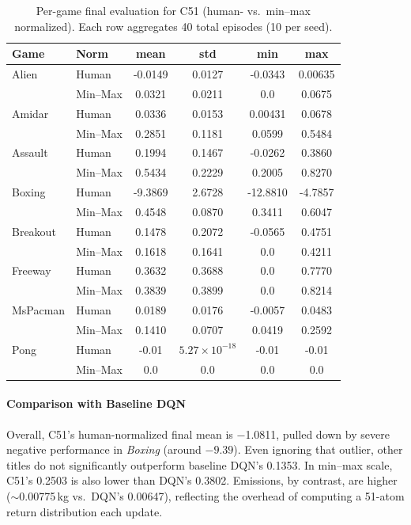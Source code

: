 \begin{table}
	\caption{Per-game final evaluation for C51 (human- vs.\ min--max normalized). 
		Each row aggregates 40 total episodes (10 per seed).}
	\label{tab:c51_eval_gamewise}
	\centering
	\begin{tabular}{llcccc}
		\toprule
		\textbf{Game} & \textbf{Norm} & \textbf{mean} & \textbf{std} & \textbf{min} & \textbf{max}\\
		\midrule
		Alien & Human    & -0.0149 & 0.0127 & -0.0343 & 0.00635 \\
		& Min--Max & 0.0321  & 0.0211 & 0.0     & 0.0675 \\
		\cmidrule{1-6}
		Amidar & Human   & 0.0336  & 0.0153 & 0.00431 & 0.0678 \\
		& Min--Max & 0.2851 & 0.1181 & 0.0599  & 0.5484 \\
		\cmidrule{1-6}
		Assault & Human  & 0.1994  & 0.1467 & -0.0262 & 0.3860 \\
		& Min--Max & 0.5434 & 0.2229 & 0.2005  & 0.8270 \\
		\cmidrule{1-6}
		Boxing & Human   & -9.3869 & 2.6728 & -12.8810 & -4.7857 \\
		& Min--Max & 0.4548  & 0.0870 & 0.3411   & 0.6047 \\
		\cmidrule{1-6}
		Breakout & Human & 0.1478  & 0.2072 & -0.0565 & 0.4751 \\
		& Min--Max & 0.1618 & 0.1641 & 0.0     & 0.4211 \\
		\cmidrule{1-6}
		Freeway & Human  & 0.3632  & 0.3688 & 0.0      & 0.7770 \\
		& Min--Max & 0.3839 & 0.3899 & 0.0     & 0.8214 \\
		\cmidrule{1-6}
		MsPacman & Human & 0.0189  & 0.0176 & -0.0057 & 0.0483 \\
		& Min--Max & 0.1410 & 0.0707 & 0.0419 & 0.2592 \\
		\cmidrule{1-6}
		Pong & Human     & -0.01   & $5.27\times 10^{-18}$ & -0.01 & -0.01 \\
		& Min--Max & 0.0     & 0.0     & 0.0     & 0.0 \\
		\bottomrule
	\end{tabular}
\end{table}

\paragraph{Comparison with Baseline DQN}
Overall, C51's human-normalized final mean is \num{-1.0811}, pulled down by severe negative performance in \emph{Boxing} (around $-9.39$). Even ignoring that outlier, other titles do not significantly outperform baseline DQN's \num{0.1353}. In min--max scale, C51's \num{0.2503} is also lower than DQN's \num{0.3802}. Emissions, by contrast, are higher ($\sim$\num{0.00775}\,kg vs.\ DQN's \num{0,00647}), reflecting the overhead of computing a 51-atom return distribution each update.

